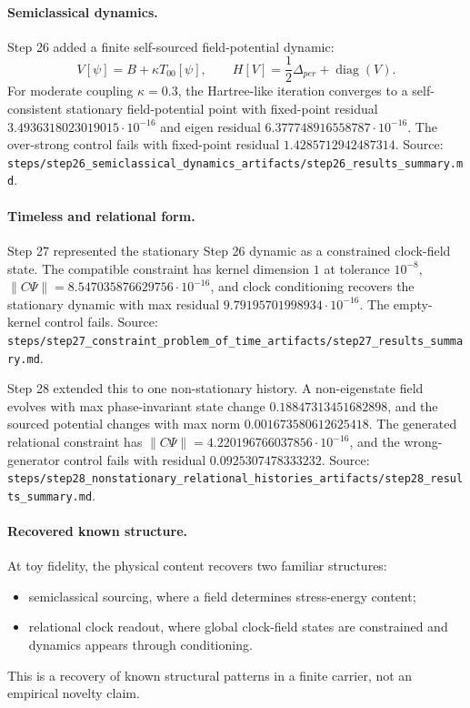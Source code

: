 \paragraph{Semiclassical dynamics.}
Step 26 added a finite self-sourced field-potential dynamic:
\[
V[\psi]=B+\kappa T_{00}[\psi],
\qquad
H[V]=\frac12\Delta_{per}+\operatorname{diag}(V).
\]
For moderate coupling \(\kappa=0.3\), the Hartree-like iteration converges to
a self-consistent stationary field-potential point with fixed-point residual
\(3.4936318023019015\cdot 10^{-16}\) and eigen residual
\(6.377748916558787\cdot 10^{-16}\).  The over-strong control fails with
fixed-point residual \(1.4285712942487314\).  Source:
\texttt{steps/step26\_semiclassical\_dynamics\_artifacts/step26\_results\_summary.md}.

\paragraph{Timeless and relational form.}
Step 27 represented the stationary Step 26 dynamic as a constrained
clock-field state.  The compatible constraint has kernel dimension \(1\) at
tolerance \(10^{-8}\), \(\|C\Psi\|=8.547035876629756\cdot 10^{-16}\), and
clock conditioning recovers the stationary dynamic with max residual
\(9.79195701998934\cdot 10^{-16}\).  The empty-kernel control fails.  Source:
\texttt{steps/step27\_constraint\_problem\_of\_time\_artifacts/step27\_results\_summary.md}.

Step 28 extended this to one non-stationary history.  A non-eigenstate field
evolves with max phase-invariant state change \(0.18847313451682898\), and
the sourced potential changes with max norm \(0.001673580612625418\).  The
generated relational constraint has \(\|C\Psi\|=4.220196766037856\cdot
10^{-16}\), and the wrong-generator control fails with residual
\(0.0925307478333232\).  Source:
\texttt{steps/step28\_nonstationary\_relational\_histories\_artifacts/step28\_results\_summary.md}.

\paragraph{Recovered known structure.}
At toy fidelity, the physical content recovers two familiar structures:
\begin{itemize}
\item semiclassical sourcing, where a field determines stress-energy content;
\item relational clock readout, where global clock-field states are constrained
  and dynamics appears through conditioning.
\end{itemize}
This is a recovery of known structural patterns in a finite carrier, not an
empirical novelty claim.

